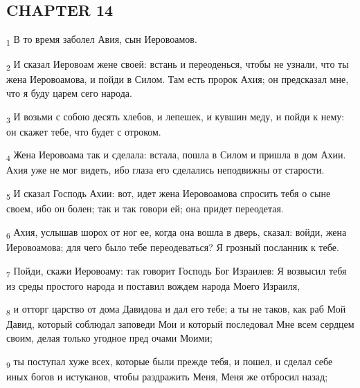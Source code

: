 \subsection{CHAPTER 14}
\begin{tcolorbox}
\textsubscript{1} В то время заболел Авия, сын Иеровоамов.
\end{tcolorbox}
\begin{tcolorbox}
\textsubscript{2} И сказал Иеровоам жене своей: встань и переоденься, чтобы не узнали, что ты жена Иеровоамова, и пойди в Силом. Там есть пророк Ахия; он предсказал мне, что я буду царем сего народа.
\end{tcolorbox}
\begin{tcolorbox}
\textsubscript{3} И возьми с собою десять хлебов, и лепешек, и кувшин меду, и пойди к нему: он скажет тебе, что будет с отроком.
\end{tcolorbox}
\begin{tcolorbox}
\textsubscript{4} Жена Иеровоама так и сделала: встала, пошла в Силом и пришла в дом Ахии. Ахия уже не мог видеть, ибо глаза его сделались неподвижны от старости.
\end{tcolorbox}
\begin{tcolorbox}
\textsubscript{5} И сказал Господь Ахии: вот, идет жена Иеровоамова спросить тебя о сыне своем, ибо он болен; так и так говори ей; она придет переодетая.
\end{tcolorbox}
\begin{tcolorbox}
\textsubscript{6} Ахия, услышав шорох от ног ее, когда она вошла в дверь, сказал: войди, жена Иеровоамова; для чего было тебе переодеваться? Я грозный посланник к тебе.
\end{tcolorbox}
\begin{tcolorbox}
\textsubscript{7} Пойди, скажи Иеровоаму: так говорит Господь Бог Израилев: Я возвысил тебя из среды простого народа и поставил вождем народа Моего Израиля,
\end{tcolorbox}
\begin{tcolorbox}
\textsubscript{8} и отторг царство от дома Давидова и дал его тебе; а ты не таков, как раб Мой Давид, который соблюдал заповеди Мои и который последовал Мне всем сердцем своим, делая только угодное пред очами Моими;
\end{tcolorbox}
\begin{tcolorbox}
\textsubscript{9} ты поступал хуже всех, которые были прежде тебя, и пошел, и сделал себе иных богов и истуканов, чтобы раздражить Меня, Меня же отбросил назад;
\end{tcolorbox}
